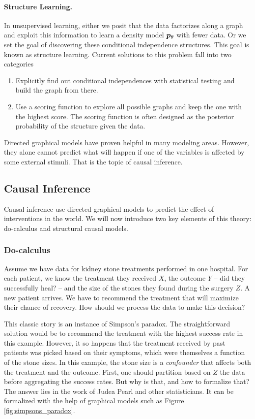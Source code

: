 \paragraph{Structure Learning.}
In unsupervised learning, either we posit that the data factorizes along a graph and exploit this information to learn a density model $\bm{p}_{\theta}$ with fewer data. Or we set the goal of discovering these conditional independence structures. This goal is known as structure learning. Current solutions to this problem fall into two categories
\begin{enumerate}
	\item Explicitly find out conditional independences with statistical testing and build the graph from there.
	\item Use a scoring function to explore all possible graphs and keep the one with the highest score. The scoring function is often designed as the posterior probability of the structure given the data.
\end{enumerate}

Directed graphical models have proven helpful in many modeling areas. However, they alone cannot predict what will happen if one of the variables is affected by some external stimuli. That is the topic of causal inference.

\subsection{Causal Inference}
\label{ssec:SCM}

Causal inference use directed graphical models to predict the effect of interventions in the world. We will now introduce two key elements of this theory: do-calculus and structural causal models.

\subsubsection{Do-calculus}
Assume we have data for kidney stone treatments performed in one hospital.
For each patient, we know the treatment they received $X$, the outcome $Y$ -- did they successfully heal? -- and the size of the stones they found during the surgery $Z$.
A new patient arrives. We have to recommend the treatment that will maximize their chance of recovery.
How should we process the data to make this decision?

This classic story is an instance of Simpson's paradox.
The straightforward solution would be to recommend the treatment with the highest success rate in this example.
However, it so happens that the treatment received by past patients was picked based on their symptoms, which were themselves a function of the stone sizes.
In this example, the stone size is a \textit{confounder} that affects both the treatment and the outcome.
First, one should partition based on $Z$ the data before aggregating the success rates. But why is that, and how to formalize that? The answer lies in the work of Judea Pearl \citep{pearl2009causality} and other statisticians. It can be formalized with the help of graphical models such as Figure \ref{fig:simpsons_paradox}.


